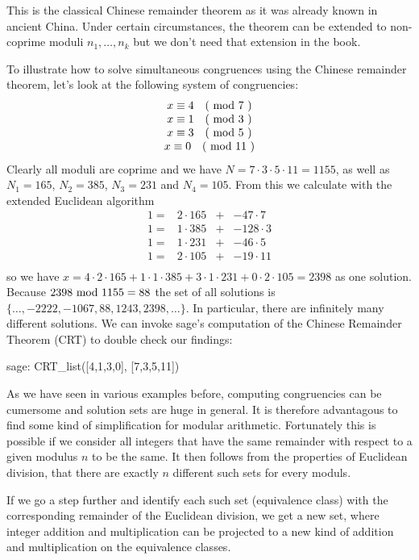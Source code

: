 This is the classical Chinese remainder theorem as it was already known in ancient China. Under certain circumstances, the theorem can be extended to non-coprime moduli $ n_1, \ldots, n_k $ but we don't need that extension in the book.
\begin{example} To illustrate how to solve simultaneous congruences using the Chinese remainder theorem, let's look at the following system of congruencies:
$$
\begin{array}{c}
x \equiv 4 \quad \text{( mod } 7 \text{ )} \\
x \equiv 1 \quad \text{( mod } 3 \text{ )} \\
x \equiv 3 \quad \text{( mod } 5 \text{ )} \\
x \equiv 0 \quad \text{( mod } 11 \text{ )} \\
\end{array}
$$
Clearly all moduli are coprime and we have $ N = 7 \cdot 3 \cdot 5 \cdot 11 = 1155 $, as well as
$ N_1 = 165 $, $ N_2 = 385 $, $ N_3 = 231 $ and $ N_4 = 105 $. From this we calculate with the extended Euclidean algorithm
$$
\begin{array}{cccc}
 1 = & 2 \cdot 165  & + & -47 \cdot 7 \\
 1 = & 1 \cdot 385  & + &  -128 \cdot 3 \\
 1 = & 1 \cdot 231  & + &  -46 \cdot 5 \\
 1 = & 2 \cdot 105  & + &  -19 \cdot 11 \\
\end{array}
$$
so we have
$x = 4 \cdot 2 \cdot 165 + 1 \cdot 1 \cdot 385 + 3 \cdot 1 \cdot 231 + 0 \cdot 2 \cdot 105 = 2398$
as one solution. Because $ 2398 \text{ mod } 1155 = 88 $ the set of all solutions is
$ \{\ldots, -2222, -1067,88,1243, 2398, \ldots \} $. In particular, there are infinitely many different solutions. We can invoke sage's computation of the Chinese Remainder Theorem (CRT) to double check our findings:
\begin{sagecommandline}
sage: CRT_list([4,1,3,0], [7,3,5,11])
\end{sagecommandline}
\end{example}
As we have seen in various examples before, computing congruencies can be cumersome and solution sets are huge in general. It is therefore advantagous to find some kind of simplification for modular arithmetic. Fortunately this is possible if we consider all integers that have the same remainder with respect to a given modulus $n$ to be the same. It then follows from the properties of Euclidean division, that there are exactly $ n $ different such sets for every moduls. 

If we go a step further and identify each such set (equivalence class) with the corresponding remainder of the Euclidean division, we get a new set, where integer addition and multiplication can be projected to a new kind of addition and multiplication on the equivalence classes. 

